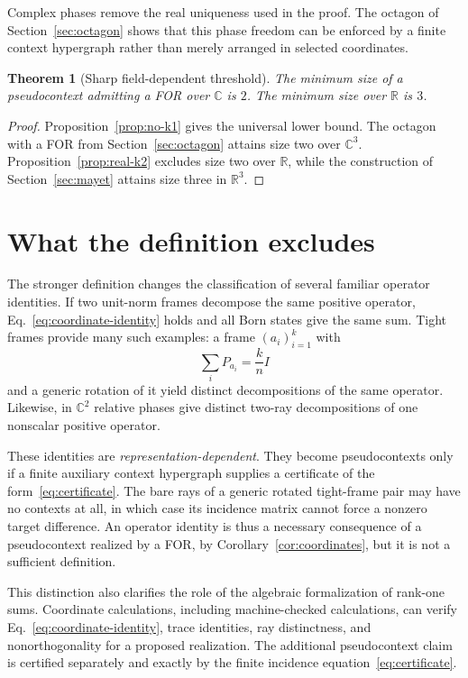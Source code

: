 \documentclass[
  twocolumn,
  aps,
  pra,
  floatfix,
  amsmath,amssymb,
  longbibliography
]{revtex4-2}
\newtheorem{theorem}{Theorem}
\theoremstyle{definition}
\theoremstyle{remark}
\newcommand{\R}{\mathbb R}
\newcommand{\C}{\mathbb C}
\begin{document}
Complex phases remove the real uniqueness used in the proof.  The octagon of
Section~\ref{sec:octagon} shows that this phase freedom can be enforced by a
finite context hypergraph rather than merely arranged in selected
coordinates.

\begin{theorem}[Sharp field-dependent threshold]
\label{thm:threshold}
The minimum size of a pseudocontext admitting a FOR over $\C$ is
$2$.  The minimum size over $\R$ is $3$.
\end{theorem}

\begin{proof}
Proposition~\ref{prop:no-k1} gives the universal lower bound.  The octagon
with a FOR from Section~\ref{sec:octagon} attains size two over
$\C^3$.  Proposition~\ref{prop:real-k2} excludes size two over $\R$, while
the construction of Section~\ref{sec:mayet} attains size three in $\R^3$.
\end{proof}

\section{What the definition excludes}
\label{sec:excludes}

The stronger definition changes the classification of several familiar
operator identities.  If two unit-norm frames decompose the same positive
operator, Eq.~\eqref{eq:coordinate-identity} holds and all Born states give
the same sum.  Tight frames provide many such examples: a frame
$(a_i)_{i=1}^k$ with
\[
 \sum_i P_{a_i}=\frac{k}{n}I
\]
and a generic rotation of it yield distinct decompositions of the same
operator.  Likewise, in $\C^2$ relative phases give distinct two-ray
decompositions of one nonscalar positive operator.

These identities are \emph{representation-dependent}.  They
become pseudocontexts only if a finite auxiliary context hypergraph supplies
a certificate of the form~\eqref{eq:certificate}.  The bare rays of a generic
rotated tight-frame pair may have no contexts at all, in which case its
incidence matrix cannot force a nonzero target difference.  An operator
identity is thus a necessary consequence of a pseudocontext realized by a
FOR, by Corollary~\ref{cor:coordinates}, but it is not a sufficient
definition.

This distinction also clarifies the role of the algebraic formalization of
rank-one sums.  Coordinate calculations, including machine-checked
calculations, can verify Eq.~\eqref{eq:coordinate-identity}, trace identities,
ray distinctness, and nonorthogonality for a proposed realization.  The
additional pseudocontext claim is certified separately and exactly by the
finite incidence equation~\eqref{eq:certificate}.
\end{document}
